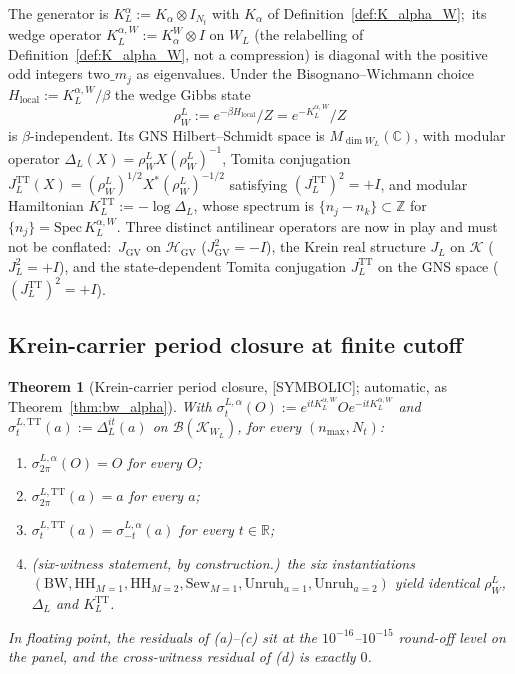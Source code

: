 \documentclass[11pt,a4paper]{article}
\theoremstyle{plain}
\newtheorem{theorem}{Theorem}[section]
\theoremstyle{definition}
\newcommand{\nmax}{n_{\max}}
\newcommand{\Hilb}{\mathcal{H}}
\newcommand{\R}{\mathbb{R}}
\newcommand{\C}{\mathbb{C}}
\newcommand{\Z}{\mathbb{Z}}
\newcommand{\TT}{\mathrm{TT}}
\newcommand{\BW}{\mathrm{BW}}
\newcommand{\HH}{\mathrm{HH}}
\newcommand{\Sew}{\mathrm{Sew}}
\newcommand{\Unruh}{\mathrm{Unruh}}
\newcommand{\Bcal}{\mathcal{B}}
\newcommand{\Krein}{\mathcal{K}}
\newcommand{\Nt}{N_t}
\newcommand{\KL}{K_{L}}
\newcommand{\JL}{J_{L}}
\begin{document}
The generator is $\KL^\alpha := K_\alpha \otimes I_{\Nt}$ with
$K_\alpha$ of Definition~\ref{def:K_alpha_W};\ its wedge operator
$\KL^{\alpha, W} := K_\alpha^W \otimes I$ on $W_L$ (the relabelling of
Definition~\ref{def:K_alpha_W}, not a compression) is diagonal with the
positive odd integers $\mathrm{two}\_m_j$ as eigenvalues.  Under the Bisognano--Wichmann choice
$H_{\mathrm{local}} := \KL^{\alpha, W}/\beta$ the wedge Gibbs state
\begin{equation}\label{eq:rho_WL}
   \rho_W^L := e^{-\beta H_{\mathrm{local}}}/Z = e^{-\KL^{\alpha, W}}/Z
\end{equation}
is $\beta$-independent.  Its GNS Hilbert--Schmidt space is
$M_{\dim W_L}(\C)$, with modular operator
$\Delta_L(X) = \rho_W^L X (\rho_W^L)^{-1}$, Tomita conjugation
$\JL^{\TT}(X) = (\rho_W^L)^{1/2} X^* (\rho_W^L)^{-1/2}$ satisfying
$(\JL^{\TT})^2 = +I$, and modular Hamiltonian
$\KL^{\TT} := -\log\Delta_L$, whose spectrum is
$\{n_j - n_k\} \subset \Z$ for $\{n_j\} = \mathrm{Spec}\,\KL^{\alpha, W}$.
Three distinct antilinear operators are now in play and must not be
conflated:\ $J_{\mathrm{GV}}$ on $\Hilb_{\mathrm{GV}}$
($J_{\mathrm{GV}}^2 = -I$), the Krein real structure $\JL$ on $\Krein$
($\JL^2 = +I$), and the state-dependent Tomita conjugation $\JL^{\TT}$
on the GNS space ($(\JL^{\TT})^2 = +I$).

\subsection{Krein-carrier period closure at finite cutoff}
\label{sec:krein_four_witness_theorem}

\begin{theorem}[Krein-carrier period closure, {[SYMBOLIC]}; automatic,
as Theorem~\ref{thm:bw_alpha}]
\label{thm:krein_four_witness}
With $\sigma_t^{L,\alpha}(O) := e^{it\KL^{\alpha, W}} O e^{-it\KL^{\alpha, W}}$
and $\sigma_t^{L,\TT}(a) := \Delta_L^{it}(a)$ on
$\Bcal(\Krein_{W_L})$, for every $(\nmax, \Nt)$:
\begin{enumerate}\setlength{\itemsep}{2pt}
\item[(a)] $\sigma_{2\pi}^{L,\alpha}(O) = O$ for every $O$;
\item[(b)] $\sigma_{2\pi}^{L,\TT}(a) = a$ for every $a$;
\item[(c)] $\sigma_t^{L,\TT}(a) = \sigma_{-t}^{L,\alpha}(a)$ for every
$t \in \R$;
\item[(d)] \emph{(six-witness statement, by construction.)}\ the six
instantiations $(\BW, \HH_{M=1}, \HH_{M=2}, \Sew_{M=1}, \Unruh_{a=1},
\Unruh_{a=2})$ yield identical $\rho_W^L$, $\Delta_L$ and $\KL^{\TT}$.
\end{enumerate}
In floating point, the residuals of (a)--(c) sit at the
$10^{-16}$--$10^{-15}$ round-off level on the panel, and the
cross-witness residual of (d) is exactly $0$.
\end{theorem}
\end{document}
